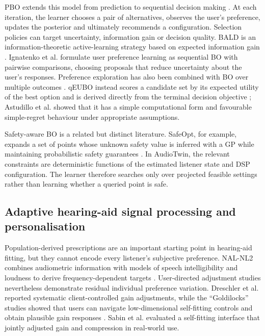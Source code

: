 \documentclass[preprint,12pt]{elsarticle}
\begin{document}
PBO extends this model from prediction to sequential decision making \cite{gonzalez2017}. At each iteration, the learner chooses a pair of alternatives, observes the user's preference, updates the posterior and ultimately recommends a configuration. Selection policies can target uncertainty, information gain or decision quality. BALD is an information-theoretic active-learning strategy based on expected information gain \cite{houlsby2011}. Ignatenko et al. \cite{ignatenko2025} formulate user preference learning as sequential BO with pairwise comparisons, choosing proposals that reduce uncertainty about the user's responses. Preference exploration has also been combined with BO over multiple outcomes \cite{lin2022}. qEUBO instead scores a candidate set by its expected utility of the best option and is derived directly from the terminal decision objective \cite{astudillo2023}; Astudillo et al. showed that it has a simple computational form and favourable simple-regret behaviour under appropriate assumptions.

Safety-aware BO is a related but distinct literature. SafeOpt, for example, expands a set of points whose unknown safety value is inferred with a GP while maintaining probabilistic safety guarantees \cite{sui2015}. In AudioTwin, the relevant constraints are deterministic functions of the estimated listener state and DSP configuration. The learner therefore searches only over projected feasible settings rather than learning whether a queried point is safe.

\subsection{Adaptive hearing-aid signal processing and personalisation}

Population-derived prescriptions are an important starting point in hearing-aid fitting, but they cannot encode every listener's subjective preference. NAL-NL2 combines audiometric information with models of speech intelligibility and loudness to derive frequency-dependent targets \cite{keidser2011}. User-directed adjustment studies nevertheless demonstrate residual individual preference variation. Dreschler et al. \cite{dreschler2008} reported systematic client-controlled gain adjustments, while the ``Goldilocks'' studies showed that users can navigate low-dimensional self-fitting controls and obtain plausible gain responses \cite{boothroyd2017,mackersie2019}. Sabin et al. \cite{sabin2020} evaluated a self-fitting interface that jointly adjusted gain and compression in real-world use.
\end{document}
